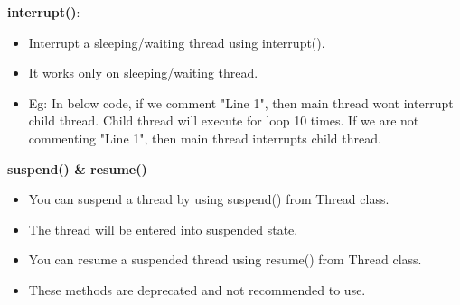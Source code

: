 \begin{flushleft}
	\textbf{interrupt()}:
		\begin{itemize}
			\item Interrupt a sleeping/waiting thread using interrupt().
			\item It works only on sleeping/waiting thread.
			\bigskip
			\item Eg: In below code, if we comment "Line 1", then main thread wont interrupt child thread. Child thread will execute for loop 10 times. 
			If we are not commenting "Line 1", then main thread interrupts child thread. 
			\bigskip
			\bigskip
		\end{itemize}
		
		\textbf{suspend() \& resume()} 
		\begin{itemize}
			\item You can suspend a thread by using suspend() from Thread class.
			\item The thread will be entered into suspended state.
			\item You can resume a suspended thread using resume() from Thread class.
			\item These methods are deprecated and not recommended to use.
		\end{itemize}
		





\end{flushleft}
